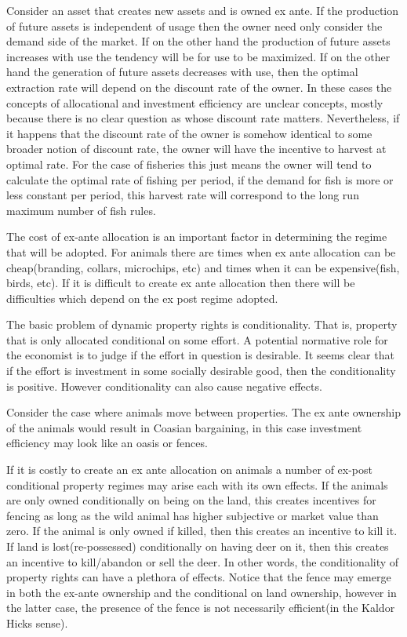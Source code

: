 \documentclass[12pt]{article}
\numberwithin{equation}{section}
\begin{document}
Consider an asset that creates new assets and is owned ex ante. If the production of future assets is independent of usage then the owner need only consider the demand side of the market. If on the other hand the production of future assets increases with use the tendency will be for use to be maximized. If on the other hand the generation of future assets decreases with use, then the optimal extraction rate will depend on the discount rate of the owner. In these cases the concepts of allocational and investment efficiency are unclear concepts, mostly because there is no clear question as whose discount rate matters. Nevertheless, if it happens that the discount rate of the owner is somehow identical to some broader notion of discount rate, the owner will have the incentive to harvest at optimal rate. For the case of fisheries this just means the owner will tend to calculate the optimal rate of fishing per period, if the demand for fish is more or less constant per period, this harvest rate will correspond to the long run maximum number of fish rules.  

The cost of ex-ante allocation is an important factor in determining the regime that will be adopted. For animals there are times when ex ante allocation can be cheap(branding, collars, microchips, etc) and times when it can be expensive(fish, birds, etc). If it is difficult to create ex ante allocation then there will be difficulties which depend on the ex post regime adopted. 

The basic problem of dynamic property rights is conditionality. That is, property that is only allocated conditional on some effort. A potential normative role for the economist is to judge if the effort in question is desirable. It seems clear that if the effort is investment in some socially desirable good, then the conditionality is positive. However conditionality can also cause negative effects. 

Consider the case where animals move between properties. The ex ante ownership of the animals would result in Coasian bargaining, in this case investment efficiency may look like an oasis or fences.

If it is costly to create an ex ante allocation on animals a number of ex-post conditional property regimes may arise each with its own effects. If the animals are only owned conditionally on being on the land, this creates incentives for fencing as long as the wild animal has higher subjective or market value than zero. If the animal is only owned if killed, then this creates an incentive to kill it. If land is lost(re-possessed) conditionally on having deer on it, then this creates an incentive to kill/abandon or sell the deer. In other words, the conditionality of property rights can have a plethora of effects. Notice that the fence may emerge in both the ex-ante ownership and the conditional on land ownership, however in the latter case, the presence of the fence is not necessarily efficient(in the Kaldor Hicks sense). 
\end{document}
